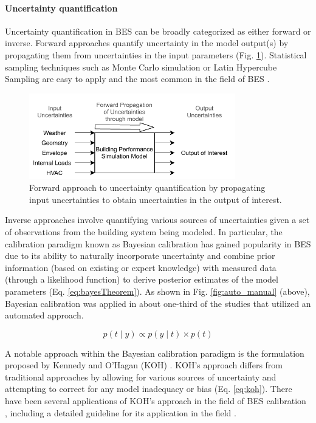 \documentclass[review]{elsarticle}
\begin{document}
\paragraph{Uncertainty quantification}

Uncertainty quantification in BES can be broadly categorized as either forward or inverse. Forward approaches quantify uncertainty in the model output(s) by propagating them from uncertainties in the input parameters (Fig. \ref{fig:forward}). Statistical sampling techniques such as Monte Carlo simulation or Latin Hypercube Sampling are easy to apply and the most common in the field of BES \cite{yun2017development, harmer2015using, cipriano2015evaluation, sakiyama2020natural, giuliani2016modeling}.

\begin{figure}[!h]
\centering
\includegraphics[width=0.8\textwidth]{figures/forward_uncertainty.pdf}
\caption{Forward approach to uncertainty quantification by propagating input uncertainties to obtain uncertainties in the output of interest.}
\label{fig:forward}
\end{figure}

Inverse approaches involve quantifying various sources of uncertainties given a set of observations from the building system being modeled. In particular, the calibration paradigm known as Bayesian calibration has gained popularity in BES due to its ability to naturally incorporate uncertainty and combine prior information (based on existing or expert knowledge) with measured data (through a likelihood function) to derive posterior estimates of the model parameters (Eq. \ref{eq:bayesTheorem}). As shown in Fig. \ref{fig:auto_manual} (above), Bayesian calibration was applied in about one-third of the studies that utilized an automated approach. 

\begin{equation}\label{eq:bayesTheorem}
p(t\mid y)\propto p(y \mid t) \times p(t)
\end{equation}

A notable approach within the Bayesian calibration paradigm is the formulation
proposed by Kennedy and O'Hagan (KOH) \cite{kennedy2001bayesian}. KOH's approach differs from traditional approaches by allowing for various sources of uncertainty and attempting to correct for any model inadequacy or bias (Eq. \ref{eq:koh}). There have been several applications of KOH's approach in the field of BES calibration \cite{martinez2019energy, menberg2019influence, chong2017bayesian, yuan2017simultaneous,li2016assessment, heo2015evaluation, chong2019continuous, chen2019district, tardioli2020methodology}, including a detailed guideline for its application in the field \cite{chong2018guidelines}. 
\end{document}
